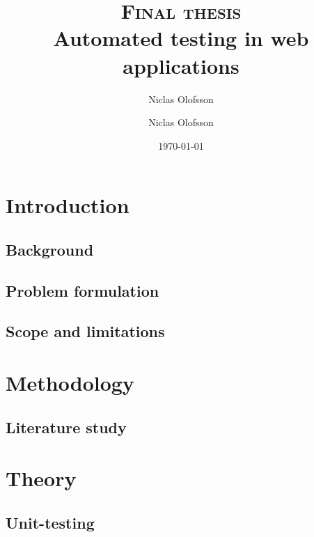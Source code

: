 \documentclass[a4paper]{report}
\author{Niclas Olofsson}
\title{\textsc{Final thesis}\\\Huge\textbf{Automated testing in web applications}}
\author{Niclas Olofsson}
\date{\today}
\begin{document}
\maketitle
\newpage

\begin{abstract}

\end{abstract}

\renewcommand{\abstractname}{Acknowledgments}
\begin{abstract}

\end{abstract}

\tableofcontents
\thispagestyle{empty} %
\newpage

\setcounter{page}{1}

\chapter{Introduction}

  \section{Background}
  

  \section{Problem formulation}
  

  \section{Scope and limitations}
  


\chapter{Methodology}
  

  \section{Literature study}
  


\chapter{Theory}

  \section{Unit-testing}
  
\end{document}
